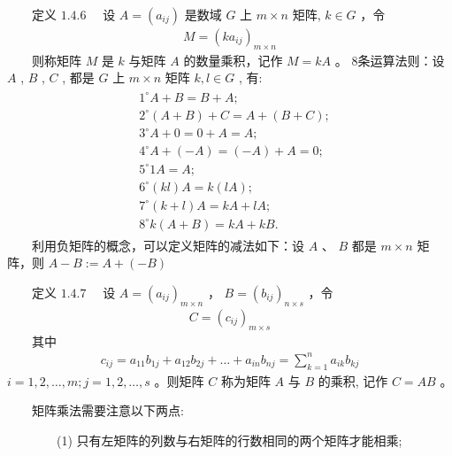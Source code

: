 \documentclass[a4paper,11pt,english]{sphinxmanual}
\begin{document}
\sphinxAtStartPar
​  定义 \(1.4.6\)  设  \(A=\left(a_{ij}\right)\) 是数域 \(G\) 上 \(m \times n\) 矩阵,  \(k \in G\)  ，令
\begin{equation*}
\begin{split}M=\left(k a_{i j}\right)_{m \times n}\end{split}
\end{equation*}
\sphinxAtStartPar
​  则称矩阵  \(M\) 是 \(k\)  与矩阵  \(A\)  的数量乘积，记作  \(M=k A\)  。 8条运算法则：设  \(A\) , \(B\) , \(C\) , 都是  \(G\)  上  \(m \times n\) 矩阵 \(k, l \in G\) , 有:
\begin{equation*}
\begin{split}\begin{aligned}& 1^{\circ} A+B=B+A ; \\&
2^{\circ}(A+B)+C=A+(B+C) ;\\&
3^{\circ} A+0=0+A=A ;\\&
4^{\circ} A+(-A)=(-A)+A=0 ;  \\&
5^{\circ} 1 A=A ;\\&
6^{\circ}(k l) A=k(l A) ;\\&
7^{\circ}(k+l) A=k A+l A ; \\&
8^{\circ} k(A+B)=k A+k B .\end{aligned}\end{split}
\end{equation*}
\sphinxAtStartPar
​  利用负矩阵的概念，可以定义矩阵的减法如下：设  \(A\) 、 \(B\)  都是  \(m \times n\) 矩阵，则  \(A-B:=A+(-B)\)

\sphinxAtStartPar
​  定义 \(1.4.7\)   设  \(A=\left(a_{i j}\right)_{m \times n}\) ，  \(B=\left(b_{i j}\right)_{n \times s}\) ，令
\begin{equation*}
\begin{split}C=\left(c_{i j}\right)_{m \times s}\end{split}
\end{equation*}
\sphinxAtStartPar
​  其中
\begin{equation*}
\begin{split}c_{i j}=a_{11} b_{1 j}+a_{12} b_{2 j}+\ldots+a_{i n} b_{n j}=\sum_{k=1}^{n} a_{ik} b_{kj}\end{split}
\end{equation*}
\sphinxAtStartPar
\(i=1,2, \ldots, m ; j=1,2, \ldots, s\) 。则矩阵  \(C\)  称为矩阵  \(A\)  与  \(B\)  的乘积, 记作  \(C=A B\) 。

\sphinxAtStartPar
​  矩阵乘法需要注意以下两点:

\sphinxAtStartPar
​  ​  (1) 只有左矩阵的列数与右矩阵的行数相同的两个矩阵才能相乘;
\end{document}
